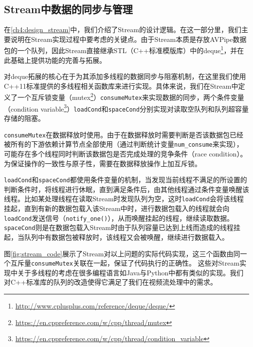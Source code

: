 \subsection{Stream中数据的同步与管理}
在\ref{ch4:design_stream}中，我们介绍了Stream的设计逻辑。在这一部分里，我们主要说明在Stream实现过程中要考虑的关键点。由于Stream本质是存放AVPipe数据包的一个队列，因此Stream直接继承STL（C++标准模版库）中的deque\footnote{\url{http://www.cplusplus.com/reference/deque/deque/}}，并在此基础上提供功能的完善与拓展。\par

对deque拓展的核心在于为其添加多线程的数据同步与阻塞机制，在这里我们使用C++11标准提供的多线程相关函数库来进行实现。具体来说，我们在Stream中定义了一个互斥锁变量（mutex\footnote{\url{https://en.cppreference.com/w/cpp/thread/mutex}}）\texttt{consumeMutex}来实现数据的同步，两个条件变量（condition variable\footnote{\url{https://en.cppreference.com/w/cpp/thread/condition_variable}}）\texttt{loadCond}和\texttt{spaceCond}分别实现对读取空队列和队列超容量存储的阻塞。\par

\texttt{consumeMutex}在数据释放时使用。由于在数据释放时需要判断是否该数据包已经被所有的下游依赖计算节点全部使用（通过判断统计变量\texttt{num\_consume}来实现），可能存在多个线程同时判断该数据包是否完成处理的竞争条件（race condition）。为保证操作的一致性与原子性，需要在数据释放操作上加互斥锁。\par

\texttt{loadCond}和\texttt{spaceCond}都使用条件变量的机制，当发现当前线程不满足的所设置的判断条件时，将线程进行休眠，直到满足条件后，由其他线程通过条件变量唤醒该线程。比如某处理线程在读取Stream时发现队列为空，这时\texttt{loadCond}会将该线程挂起，直到有新的数据包载入该Stream中时，进行数据包载入的线程就会向\texttt{loadCond}发送信号（\texttt{notify\_one()}），从而唤醒挂起的线程，继续读取数据。\texttt{spaceCond}则是在数据包载入Stream时由于队列容量已达到上线而造成的线程挂起，当队列中有数据包被释放时，该线程又会被唤醒，继续进行数据载入。\par

图\ref{fig:stream_code}展示了Stream对以上问题的实际代码实现，这三个函数由同一个互斥量\texttt{consumeMutex}关联在一起，保证了代码执行的正确性。
这些对Stream实现中关于多线程的考虑在很多编程语言如Java与Python中都有类似的实现。我们对C++标准库的队列的改造使得它满足了我们在视频流处理中的需求。

